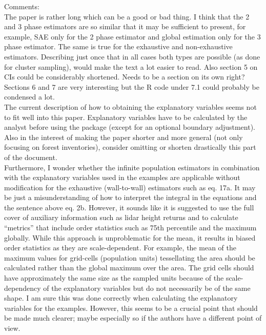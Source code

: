 \documentclass{article}
\begin{document}
Comments:\\

The paper is rather long which can be a good or bad thing. I think that the 2 and 3 phase estimators are so similar that it may be sufficient to present, for example, SAE only for the 2 phase estimator and global estimation only for the 3 phase estimator. The same is true for the exhaustive and non-exhaustive estimators. Describing just once that in all cases both types are possible (as done for cluster sampling), would make the text a lot easier to read. Also section 5 on CIs could be considerably shortened. Needs to be a section on its own right? Sections 6 and 7 are very interesting but the R code under 7.1 could probably be condensed a lot.\\

The current description of how to obtaining the explanatory variables seems not to fit well into this paper. Explanatory variables have to be calculated by the analyst before using the package (except for an optional boundary adjustment). Also in the interest of making the paper shorter and more general (not only focusing on forest inventories), consider omitting or shorten drastically this part of the document.\\

Furthermore, I wonder whether the infinite population estimators in combination with the explanatory variables used in the examples are applicable without modification for the exhaustive (wall-to-wall) estimators such as eq. 17a. It may be just a misunderstanding of how to interpret the integral in the equations and the sentence above eq. 2b. However, it sounds like it is suggested to use the full cover of auxiliary information such as lidar height returns and to calculate “metrics” that include order statistics such as 75th percentile and the maximum globally. While this approach is unproblematic for the mean, it results in biased order statistics as they are scale-dependent. For example, the mean of the maximum values for grid-cells (population units) tessellating the area should be calculated rather than the global maximum over the area. The grid cells should have approximately the same size as the sampled units because of the scale-dependency of the explanatory variables but do not necessarily be of the same shape. I am sure this was done correctly when calculating the explanatory variables for the examples. However, this seems to be a crucial point that should be made much clearer; maybe especially so if the authors have a different point of view.\\
\end{document}
